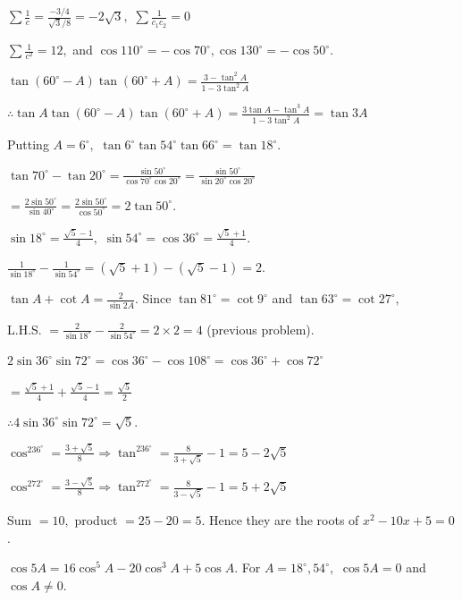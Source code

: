   $\sum\frac{1}{c} = \frac{-3/4}{\sqrt{3}/8} = -2\sqrt{3},$ $\sum\frac{1}{c_1c_2} = 0$

  $\sum\frac{1}{c^2} = 12,$ and $\cos110^\circ = -\cos70^\circ, \cos130^\circ = -\cos50^\circ$.

\item $\tan(60^\circ - A)\tan(60^\circ + A) = \frac{3 - \tan^2A}{1 - 3\tan^2A}$

  $\therefore \tan A\tan(60^\circ - A)\tan(60^\circ + A) = \frac{3\tan A - \tan^3A}{1 - 3\tan^2A} = \tan3A$

  Putting $A = 6^\circ,$ $\tan6^\circ\tan54^\circ\tan66^\circ = \tan18^\circ$.

\item $\tan70^\circ - \tan20^\circ = \frac{\sin50^\circ}{\cos70^\circ\cos20^\circ} = \frac{\sin50^\circ}{\sin20^\circ\cos20^\circ}$

  $= \frac{2\sin50^\circ}{\sin40^\circ} = \frac{2\sin50^\circ}{\cos50^\circ} = 2\tan50^\circ$.

\item $\sin18^\circ = \frac{\sqrt{5} - 1}{4},$ $\sin54^\circ = \cos36^\circ = \frac{\sqrt{5} + 1}{4}$.

  $\frac{1}{\sin18^\circ} - \frac{1}{\sin54^\circ} = (\sqrt{5} + 1) - (\sqrt{5} - 1) = 2$.

\item $\tan A + \cot A = \frac{2}{\sin2A}$. Since $\tan81^\circ = \cot9^\circ$ and $\tan63^\circ = \cot27^\circ,$

  L.H.S. $= \frac{2}{\sin18^\circ} - \frac{2}{\sin54^\circ} = 2\times2 = 4$ (previous problem).

\item $2\sin36^\circ\sin72^\circ = \cos36^\circ - \cos108^\circ = \cos36^\circ + \cos72^\circ$

  $= \frac{\sqrt{5} + 1}{4} + \frac{\sqrt{5} - 1}{4} = \frac{\sqrt{5}}{2}$

  $\therefore 4\sin36^\circ\sin72^\circ = \sqrt{5}$.

\item $\cos^236^\circ = \frac{3 + \sqrt{5}}{8} \Rightarrow \tan^236^\circ = \frac{8}{3 + \sqrt{5}} - 1 = 5 - 2\sqrt{5}$

  $\cos^272^\circ = \frac{3 - \sqrt{5}}{8} \Rightarrow \tan^272^\circ = \frac{8}{3 - \sqrt{5}} - 1 = 5 + 2\sqrt{5}$

  Sum $= 10,$ product $= 25 - 20 = 5$. Hence they are the roots of $x^2 - 10x + 5 = 0$.

\item $\cos5A = 16\cos^5A - 20\cos^3A + 5\cos A$. For $A = 18^\circ, 54^\circ,$ $\cos5A = 0$ and $\cos A \neq 0$.

